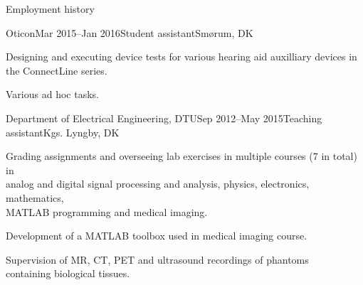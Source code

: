 \documentclass{resume} %
\begin{document}
\begin{rSection}{Employment history}
	\begin{rSubsection}{Oticon}{Mar 2015--Jan 2016}{Student assistant}{Smørum, DK}
		\item Designing and executing device tests for various hearing aid auxilliary devices in \\the ConnectLine series.
		\item Various ad hoc tasks.
	\end{rSubsection}
	
	\begin{rSubsection}{Department of Electrical Engineering, DTU}{Sep 2012--May 2015}{Teaching assistant}{Kgs. Lyngby, DK}
		\item Grading assignments and overseeing lab exercises in multiple courses (7 in total) in\\ analog and digital signal processing and analysis, physics, electronics, mathematics, \\MATLAB programming and medical imaging. 
		\item Development of a MATLAB toolbox used in medical imaging course. 
		\item Supervision of MR, CT, PET and ultrasound recordings of phantoms \\containing biological tissues.
	\end{rSubsection}
	
	
	

\end{rSection}
\end{document}
